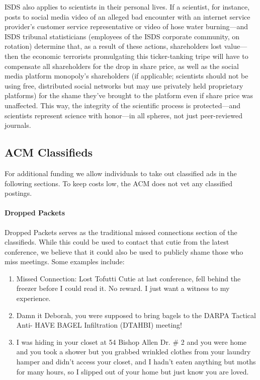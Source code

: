 ISDS also applies to scientists in their personal lives. If a scientist, for instance, posts to social media video of an alleged bad encounter with an internet service provider's customer service representative or video of hose water burning---and ISDS tribunal statisticians (employees of the ISDS corporate community, on rotation) determine that, as a result of these actions, shareholders lost value---then the economic terrorists promulgating this ticker-tanking tripe will have to compensate all shareholders for the drop in share price, as well as the social media platform monopoly's shareholders (if applicable; scientists should not be using free, distributed social networks but may use privately held proprietary platforms) for the shame they've brought to the platform even if share price was unaffected. This way, the integrity of the scientific process is protected---and scientists represent science with honor---in all spheres, not just peer-reviewed journals.   

\subsection{ACM Classifieds}
For additional funding we allow individuals to take out classified ads in the
following sections.
To keep costs low, the ACM does not vet any classified postings.

\paragraph{Dropped Packets}
Dropped Packets serves as the traditional missed connections section of the
classifieds.
While this could be used to contact that cutie from the latest conference, we
believe that it could also be used to publicly shame those who miss meetings.
Some examples include:

\begin{enumerate}
  \item Missed Connection: Lost Tofutti Cutie at last conference, fell behind the freezer before I could read it. No reward. I just want a witness to my experience.

  \item Damn it Deborah, you were supposed to bring bagels to the DARPA
Tactical Anti- HAVE BAGEL Infiltration 
(DTAHBI) meeting!

  \item I was hiding in your closet at 54 Bishop Allen Dr. \# 2 and you were home and you took a shower but you grabbed wrinkled clothes from your laundry hamper and didn't access your closet, and I hadn't eaten anything but moths for many hours, so I slipped out of your home but just know you are loved.
\end{enumerate}


